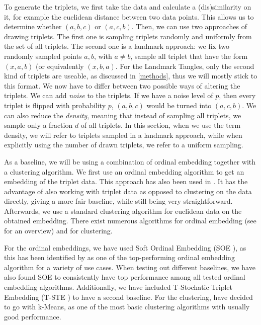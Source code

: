 To generate the triplets, we first take the data and calculate a (dis)similarity on it, for example the euclidean distance between two data points. This allows
us to determine whether $(a,b,c)$ or $(a,c,b)$.
Then, we can use two approaches of drawing triplets. The first one is sampling triplets randomly and uniformly from the set of all triplets. The second one is a landmark approach:
we fix two randomly sampled points $a,b$, with $a \neq b$, sample all triplet that have the form $(x,a,b)$ (or equivalently $(x,b,a)$.  For the Landmark Tangles, only the 
second kind of triplets are useable, as discussed in \autoref{methods}, thus we will mostly stick to this format. 
We now have to differ between two possible ways of altering the triplets. We can add \textit{noise}
to the triplets. If we have a noise level of $p$, then every triplet is flipped with probability $p$, $(a,b,c)$ would be turned into $(a,c,b)$. We can also reduce
the \textit{density}, meaning that instead of sampling all triplets, we sample only a fraction $d$ of all triplets. In this section, when we use the term density, we
will refer to triplets sampled in a landmark approach, while when explicitly using the number of drawn triplets, we refer to a uniform sampling.

As a baseline, we will be using a combination of ordinal embedding together with a clustering algorithm. 
We first use an ordinal embedding algorithm to get an embedding of the triplet data. This approach has also been used in \cite{kleindessnerLensDepthFunction2017}. 
It has the advantage of also working with triplet data as opposed to clustering on the data directly, giving a more fair baseline, while still being very straightforward.
Afterwards, we use a standard clustering algorithm for euclidean data on the obtained embedding.  
There exist numerous algorithms for ordinal embedding (see \cite{vankadaraInsightsOrdinalEmbedding2021} for an overview) and for clustering.

For the ordinal embeddings, we have used Soft Ordinal Embedding (SOE \cite{teradaLocalOrdinalEmbedding2014}), as this has been identified by \cite{vankadaraInsightsOrdinalEmbedding2021} as one of the 
top-performing ordinal embedding algorithm for a variety of use cases. When testing out different baselines, we have also found SOE to consistently have top performance among 
all tested ordinal embedding algorithms. Additionally, we have included T-Stochatic Triplet Embedding (T-STE \cite{laurensvandermaatenStochasticTripletEmbedding2012}) 
to have a second baseline. For the clustering, have decided to go with k-Means, as one of the most basic clustering algorithms with usually good performance.

